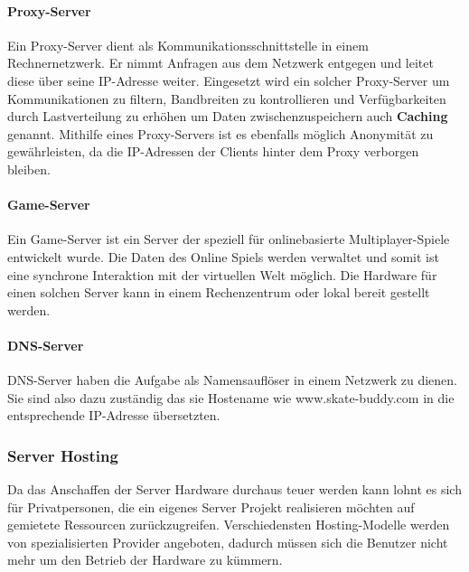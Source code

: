 \paragraph{Proxy-Server}
Ein Proxy-Server dient als Kommunikationsschnittstelle in einem Rechnernetzwerk. Er nimmt Anfragen
aus dem Netzwerk entgegen und leitet diese über seine IP-Adresse weiter. Eingesetzt wird ein solcher
Proxy-Server um Kommunikationen zu filtern, Bandbreiten zu kontrollieren und Verfügbarkeiten durch
Lastverteilung zu erhöhen um Daten zwischenzuspeichern auch \textbf{Caching} genannt. Mithilfe eines
Proxy-Servers ist es ebenfalls möglich Anonymität zu gewährleisten, da die IP-Adressen der Clients
hinter dem Proxy verborgen bleiben.

\paragraph{Game-Server}
Ein Game-Server ist ein Server der speziell für onlinebasierte Multiplayer-Spiele entwickelt wurde.
Die Daten des Online Spiels werden verwaltet und somit ist eine synchrone Interaktion mit der
virtuellen Welt möglich. Die Hardware für einen solchen Server kann in einem Rechenzentrum oder lokal
bereit gestellt werden.

\paragraph{DNS-Server}
DNS-Server haben die Aufgabe als Namensauflöser in einem Netzwerk zu dienen. Sie sind also dazu
zuständig das sie Hostename wie www.skate-buddy.com in die entsprechende IP-Adresse übersetzten.

\subsubsection{Server Hosting}
Da das Anschaffen der Server Hardware durchaus teuer werden kann lohnt es sich für Privatpersonen,
die ein eigenes Server Projekt realisieren möchten auf gemietete Ressourcen zurückzugreifen.
Verschiedensten Hosting-Modelle werden von spezialisierten Provider angeboten, dadurch müssen sich
die Benutzer nicht mehr um den Betrieb der Hardware zu kümmern.

\cite{Server}



